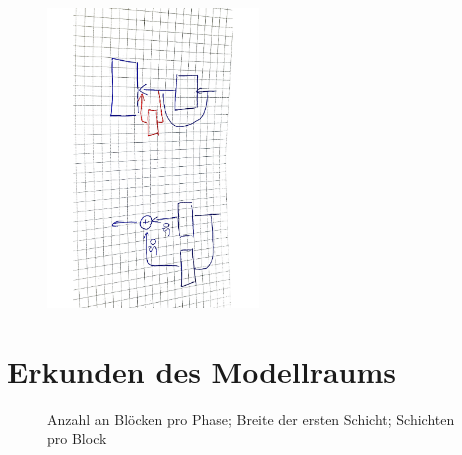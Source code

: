 \begin{figure}[h]
 \centering
 \includegraphics[width=0.5\textwidth, angle=90]{KapitelPartB/Images/deeper.pdf}
 \label{abb:deeper}
\end{figure}




\section{Erkunden des Modellraums}

 \begin{figure}
     \centering
     \caption{Anzahl an Blöcken pro Phase; Breite der ersten Schicht; Schichten pro Block}
     \hfill
\end{figure}


